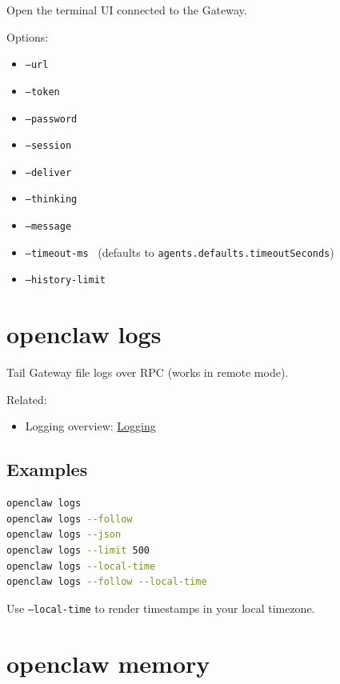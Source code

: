 Open the terminal UI connected to the Gateway.

Options:

\begin{itemize}
  \item \texttt{--url }
  \item \texttt{--token }
  \item \texttt{--password }
  \item \texttt{--session }
  \item \texttt{--deliver}
  \item \texttt{--thinking }
  \item \texttt{--message }
  \item \texttt{--timeout-ms } (defaults to \texttt{agents.defaults.timeoutSeconds})
  \item \texttt{--history-limit }
\end{itemize}



\clearpage

\section{openclaw logs}


Tail Gateway file logs over RPC (works in remote mode).

Related:

\begin{itemize}
  \item Logging overview: \href{/logging}{Logging}
\end{itemize}


\subsection{Examples}


\begin{lstlisting}[language=bash]
openclaw logs
openclaw logs --follow
openclaw logs --json
openclaw logs --limit 500
openclaw logs --local-time
openclaw logs --follow --local-time
\end{lstlisting}


Use \texttt{--local-time} to render timestamps in your local timezone.


\clearpage

\section{openclaw memory}


